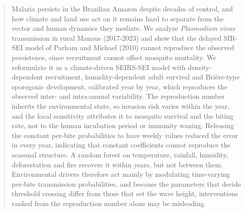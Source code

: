 \documentclass[a4paper,fleqn]{cas-dc}
\begin{document}




\begin{abstract}
Malaria persists in the Brazilian Amazon despite decades of control, and how climate and
land use act on it remains hard to separate from the vector and human dynamics they
mediate. We analyze \textit{Plasmodium vivax} transmission in rural Manaus (2017-2023) and
show that the delayed SIR-SEI model of Parham and Michael (2010) cannot reproduce the
observed persistence, since recruitment cannot offset mosquito mortality. We reformulate it
as a climate-driven SEIRS-SEI model with density-dependent recruitment, humidity-dependent
adult survival and Brière-type sporogonic development, calibrated year by year, which
reproduces the observed inter- and intra-annual variability. The reproduction number
inherits the environmental state, so invasion risk varies within the year, and the local sensitivity attributes
it to mosquito survival and the biting rate, not to the human incubation period or immunity
waning. Releasing the constant per-bite probabilities to have weekly values reduced the error in every year, indicating that
constant coefficients cannot reproduce the seasonal structure. A random forest on
temperature, rainfall, humidity, deforestation and fire recovers it within years, but not between them.
Environmental drivers therefore act mainly by modulating time-varying per-bite transmission
probabilities, and because the parameters that decide threshold crossing differ from those
that set the wave height, interventions ranked from the reproduction number alone may be
misleading.
\end{abstract}
\end{document}
